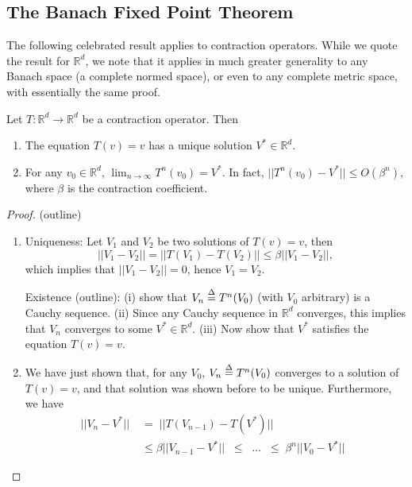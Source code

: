 \subsection{The Banach Fixed Point Theorem}
The following celebrated result applies to contraction operators. While we quote the result for $\mathbb R^d$, we note that it applies in much greater generality to any Banach space (a complete normed space), or even to any complete metric space, with essentially the same proof.

\begin{theorem}\label{thm:_BANACH}
Let $T:\mathbb R^d \to \mathbb R^d$  be a contraction operator. Then
\begin{enumerate}
  \item The equation $T(v) = v$ has a unique solution  $V^*\in \mathbb R^d$.
  \item For any $v_0 \in \mathbb R^d$,  ${\lim _{n \to \infty }}{T^n}({v_0}) = {V^*}$.
          In fact,  $||{T^n}({v_0}) - {V^*}|| \le O({\beta ^n})$, where $\beta $ is the contraction coefficient.
\end{enumerate}
\end{theorem}

\begin{proof}
(outline)
\begin{enumerate}
  \item Uniqueness: Let ${V_1}$ and ${V_2}$ be two solutions of $T(v) = v$, then
\[||{V_1} - {V_2}|| = ||T({V_1}) - T({V_2})|| \le \beta ||{V_1} - {V_2}||,\]
which implies that $||{V_1} - {V_2}|| = 0$, hence ${V_1} = {V_2}$.

Existence (outline):  (i) show that ${V_n} \buildrel \Delta \over = {T^n}({V_0})$ (with ${V_0}$ arbitrary) is a Cauchy sequence. (ii) Since any Cauchy sequence in $\mathbb R^d$ converges, this implies that ${V_n}$ converges to some $V^*\in \mathbb R^d$. (iii) Now show that ${V^*}$ satisfies the equation $T(v) = v$.
  \item We have just shown that, for any ${V_0}$, ${V_n} \buildrel \Delta \over = {T^n}({V_0})$ converges to a solution of $T(v) = v$, and that solution was shown before to be unique.  Furthermore, we have
\begin{align*}
||{V_n} - {V^*}||\; &= \;||T({V_{n - 1}}) - T({V^*})||\\
&\le \beta ||{V_{n - 1}} - {V^*}||\;\; \le \;\; \ldots \;\; \le \;{\beta ^n}||{V_0} - {V^*}||\;\;
\end{align*}
\end{enumerate}
\end{proof}


